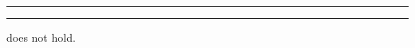 \documentclass[10pt]{article}
\newcommand\sepLine{
  \vfill
  \par\noindent\rule{\textwidth}{0.4pt}%
  \vspace{-10pt}%
  \par\noindent\rule{\textwidth}{0.4pt}
  \vfill}
\begin{document}
\sepLine

\begin{note}
  \begin{thesis}
    \issueInclusion{} does not hold.
  \end{thesis}
\end{note}



\begin{comment}
  For \issueInclusion{} to fail, need a counterexample.
  Though this is more involved.

  \begin{enumerate}
  \item
    Sense of `why' and `how'.
  \item
    Answers to \qWhy{}.
  \item
    Way to identify \fingfr{}.
  \end{enumerate}
\end{comment}

\begin{comment}
  Not really about the result.
  Argument.
  Fairly technical.
  Framework so it's possible to create a direct argument.
  Only issue is whether the definitions, ideas, etc.\ work out.
  I.e.\ whether you agree.

  Stress this point.
  Well, what do I want to stress?
  `Makes sense'.
  So, think of epistemology.
  Various cases, intuition about whether knows.
  Intuition is taken as input for creating theory.
  This is the sort of Rawlsian reflective equilibrium.

  Important constraint.
  Should not be the case framework presupposes answer.
  See how these definitions come together.
\end{comment}



\vfill


\newpage
\end{document}
